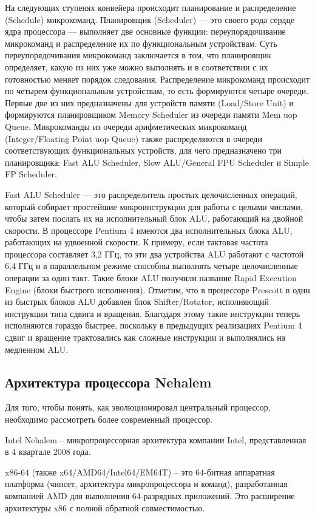 \documentclass[12pt, a4paper, utf8]{article}
\begin{document}
На следующих ступенях конвейера происходит планирование и распределение (Schedule) микрокоманд. Планировщик (Scheduler) — это своего рода сердце ядра процессора  — выполняет две основные функции: переупорядочивание микрокоманд и распределение их по функциональным устройствам. Суть переупорядочивания микрокоманд заключается в том, что планировщик определяет, какую из них уже можно выполнять и в соответствии с их готовностью меняет порядок следования. Распределение микрокоманд происходит по четырем функциональным устройствам, то есть формируются четыре очереди. Первые две из них предназначены для устройств памяти (Load/Store Unit) и формируются планировщиком Memory Scheduler из очереди памяти Mem uop Queue. Микрокоманды из очереди арифметических микрокоманд (Integer/Floating Point uop Queue) также распределяются в очереди соответствующих функциональных устройств, для чего предназначено три планировщика: Fast ALU Scheduler, Slow ALU/General FPU Scheduler и Simple FP Scheduler.

Fast ALU Scheduler — это распределитель простых целочисленных операций, который собирает простейшие микроинструкции для работы с целыми числами, чтобы затем послать их на исполнительный блок ALU, работающий на двойной скорости. В процессоре Pentium 4 имеются два исполнительных блока ALU, работающих на удвоенной скорости. К примеру, если тактовая частота процессора составляет 3,2 ГГц, то эти два устройства ALU работают с частотой 6,4 ГГц и в параллельном режиме способны выполнять четыре целочисленные операции за один такт. Такие блоки ALU получили название Rapid Execution Engine (блоки быстрого исполнения). Отметим, что в процессоре Prescott в один из быстрых блоков ALU добавлен блок Shifter/Rotator, исполняющий инструкции типа сдвига и вращения. Благодаря этому такие инструкции теперь исполняются гораздо быстрее, поскольку в предыдущих реализациях Pentium 4 сдвиг и вращение трактовались как сложные инструкции и выполнялись на медленном ALU.

\subsection{Архитектура процессора Nehalem}

Для того, чтобы понять, как эволюционировал центральный процессор, необходимо рассмотреть более современный процессор.

Intel Nehalem -- микропроцессорная архитектура компании Intel, представленная в 4 квартале 2008 года. 

x86-64 (также x64/AMD64/Intel64/EM64T) -- это  64-битная аппаратная платформа (чипсет, архитектура микропроцессора и команд), разработанная компанией AMD для выполнения 64-разрядных приложений.
Это расширение архитектуры x86 с полной обратной совместимостью.
\end{document}
